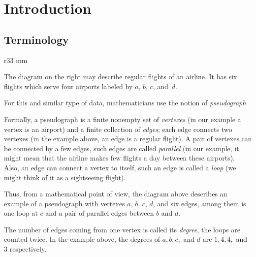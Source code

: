 \chapter{Introduction}
\section*{Terminology}

\begin{wrapfigure}{r}{33 mm}
\end{wrapfigure}

The diagram on the right may describe regular flights of an airline.
It has six flights which serve four airports labeled by $a$, $b$, $c$, and~$d$.

For this and similar type of data, mathematicians use the notion of \emph{pseudograph}.

Formally, a pseudograph is a finite nonempty set of \emph{vertexes}  (in our example a vertex is an airport) 
and a finite collection of \emph{edges}; each edge connects two vertexes (in the example above, an edge is a regular flight).
A pair of vertexes can be connected by a few edges, such edges are called \emph{parallel} (in our example, it might mean that the airline makes few flights a day between these airports). 
Also, an edge can connect a vertex to itself, such an edge is called a \emph{loop} (we might think of it as a sightseeing flight).

Thus, from a mathematical point of view, the diagram above describes an example of a pseudograph with vertexes $a$, $b$, $c$, $d$, and 
six edges, among them is one loop at $c$ and a pair of parallel edges between $b$ and $d$.

\smallskip

The number of edges coming from one vertex is called its \emph{degree}, the loops are counted twice.
In the example above,
the degrees of $a,b,c,$ and $d$ are $1,4,4,$ and $3$ respectively.

